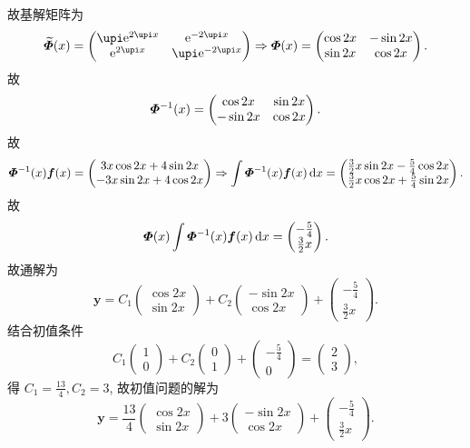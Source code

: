 \begin{solution}
  故基解矩阵为
  \[\widetilde{\bmitPhi}(x) =
    \begin{pmatrix}
      \upi\e^{2\upi x}&\e^{-2\upi x} \\
      \e^{2\upi x}&\upi\e^{-2\upi x}
    \end{pmatrix}\Rightarrow\bmitPhi(x) =
    \begin{pmatrix}\cos2x&-\sin2x\\\sin2x&\cos2x\end{pmatrix}.\]
  故
  \[\bm{\varPhi}^{-1}(x)=\begin{pmatrix}\cos2x&\sin2x\\-\sin2x&\cos2x\end{pmatrix}.\]
  故
  \[\bm{\varPhi}^{-1}(x)\bm{f}(x) = 
    \begin{pmatrix}3x\cos2x+4\sin2x\\-3x\sin2x+4\cos2x\end{pmatrix}
    \Rightarrow
    \int\bm{\varPhi}^{-1}(x)\bm{f}(x)\mathop{}\!\mathrm{d} x =
    \begin{pmatrix}
      \frac{3}{2}x\sin2x-\frac{5}{4}\cos2x \\
      \frac{3}{2}x\cos2x+\frac{5}{4}\sin2x
    \end{pmatrix}.\]
  故
  \[\bm{\varPhi}(x)\int\bm{\varPhi}^{-1}(x)\bm{f}(x)\mathop{}\!\mathrm{d} x =
    \begin{pmatrix}-\frac{5}{4}\\\frac{3}{2}x\end{pmatrix}.\]
  故通解为
  \[\bm{y} = C_1\begin{pmatrix}\cos2x\\\sin2x\end{pmatrix}
    + C_2\begin{pmatrix}-\sin2x\\\cos2x\end{pmatrix}
    + \begin{pmatrix}-\frac{5}{4}\\\frac{3}{2}x\end{pmatrix}.\]
  结合初值条件
  \[C_1\begin{pmatrix}1\\0\end{pmatrix}
    + C_2\begin{pmatrix}0\\1\end{pmatrix}
    + \begin{pmatrix}-\frac{5}{4}\\0\end{pmatrix}
    = \begin{pmatrix}2\\3\end{pmatrix},\]
  得 $C_1=\frac{13}{4},C_2=3$, 故初值问题的解为
  \[\bm{y} =
    \frac{13}{4}\begin{pmatrix}\cos2x\\\sin2x\end{pmatrix}
    + 3\begin{pmatrix}-\sin2x\\\cos2x\end{pmatrix}
    + \begin{pmatrix}-\frac{5}{4}\\\frac{3}{2}x\end{pmatrix}.\]


\end{solution}
